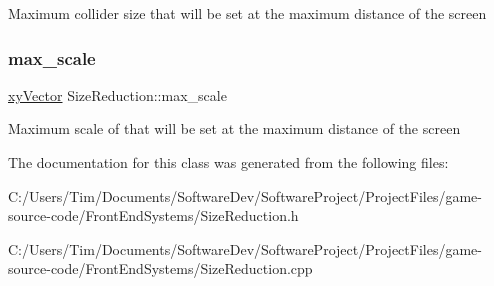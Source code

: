 Maximum collider size that will be set at the maximum distance of the screen \mbox{\label{class_size_reduction_a99ace47c7794d51e539712a3c2bc8642}} 
\subsubsection{\texorpdfstring{max\+\_\+scale}{max\_scale}}
{\footnotesize\ttfamily \hyperlink{structxy_vector}{xy\+Vector} Size\+Reduction\+::max\+\_\+scale\hspace{0.3cm}{\ttfamily [private]}}

Maximum scale of that will be set at the maximum distance of the screen 

The documentation for this class was generated from the following files\+:\begin{DoxyCompactItemize}
\item 
C\+:/\+Users/\+Tim/\+Documents/\+Software\+Dev/\+Software\+Project/\+Project\+Files/game-\/source-\/code/\+Front\+End\+Systems/Size\+Reduction.\+h\item 
C\+:/\+Users/\+Tim/\+Documents/\+Software\+Dev/\+Software\+Project/\+Project\+Files/game-\/source-\/code/\+Front\+End\+Systems/Size\+Reduction.\+cpp\end{DoxyCompactItemize}

